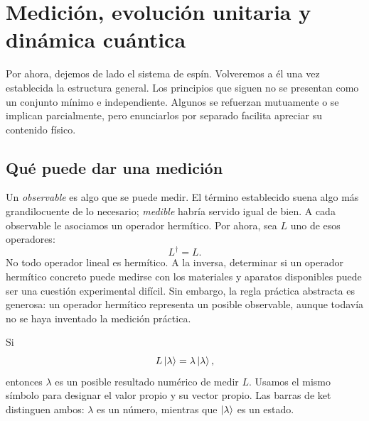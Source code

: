 \chapter{Medición, evolución unitaria y dinámica cuántica}


Por ahora, dejemos de lado el sistema de espín. Volveremos a él una vez establecida la estructura general. Los principios que siguen no se presentan como un conjunto mínimo e independiente. Algunos se refuerzan mutuamente o se implican parcialmente, pero enunciarlos por separado facilita apreciar su contenido físico.

\section{Qué puede dar una medición}

Un \emph{observable} es algo que se puede medir. El término establecido suena algo más grandilocuente de lo necesario; \emph{medible} habría servido igual de bien. A cada observable le asociamos un operador hermítico. Por ahora, sea \(L\) uno de esos operadores:
\begin{equation}
L^\dagger=L.
\end{equation}
No todo operador lineal es hermítico. A la inversa, determinar si un operador hermítico concreto puede medirse con los materiales y aparatos disponibles puede ser una cuestión experimental difícil. Sin embargo, la regla práctica abstracta es generosa: un operador hermítico representa un posible observable, aunque todavía no se haya inventado la medición práctica.

Si
\begin{equation}
L\left\lvert\lambda\right\rangle=\lambda\left\lvert\lambda\right\rangle,
\end{equation}
entonces \(\lambda\) es un posible resultado numérico de medir \(L\). Usamos el mismo símbolo para designar el valor propio y su vector propio. Las barras de ket distinguen ambos: \(\lambda\) es un número, mientras que \(\left\lvert\lambda\right\rangle\) es un estado.

